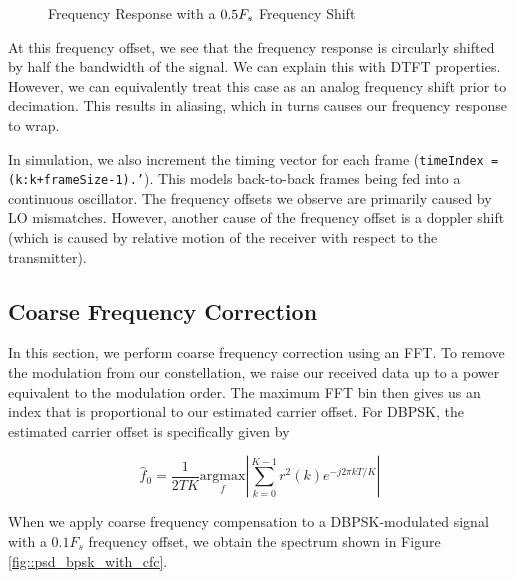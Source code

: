 \documentclass{article}
\begin{document}
\begin{figure}[H]
	\centerline{}
	\caption{Frequency Response with a $\protect{0.5F_s}$ Frequency Shift}
	\label{fig::psd_freq_offset_05}
\end{figure}

\noindent At this frequency offset, we see that the frequency response is circularly shifted by half the bandwidth of the signal. We can explain this with DTFT properties. However, we can equivalently treat this case as an analog frequency shift prior to decimation. This results in aliasing, which in turns causes our frequency response to wrap.

	In simulation, we also increment the timing vector for each frame (\texttt{timeIndex = (k:k+frameSize-1).'}). This models back-to-back frames being fed into a continuous oscillator. The frequency offsets we observe are primarily caused by LO mismatches. However, another cause of the frequency offset is a doppler shift (which is caused by relative motion of the receiver with respect to the transmitter).

\subsection{Coarse Frequency Correction}

In this section, we perform coarse frequency correction using an FFT. To remove the modulation from our constellation, we raise our received data up to a power equivalent to the modulation order. The maximum FFT bin then gives us an index that is proportional to our estimated carrier offset. For DBPSK, the estimated carrier offset is specifically given by

\begin{equation}
	\hat{f}_0 = \frac{1}{2TK}\underset{f}{\text{argmax}}\left\vert\sum_{k=0}^{K-1}{r^2(k)e^{-j2{\pi}kT/K}}\right\vert
\end{equation}
	
\noindent When we apply coarse frequency compensation to a DBPSK-modulated signal with a $0.1F_s$ frequency offset, we obtain the spectrum shown in Figure \ref{fig::psd_bpsk_with_cfc}.
\end{document}
